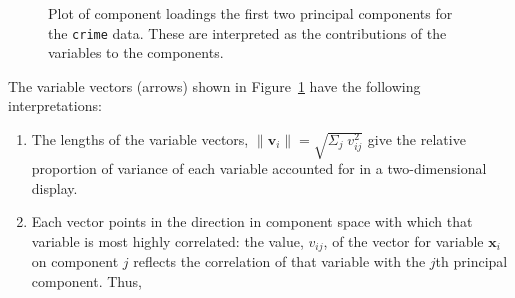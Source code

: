 \documentclass[
  letterpaper,
  10pt,
  krantz2]{krantz}
\begin{document}
\begin{figure}[H]


\caption{\label{fig-crime-vectors}Plot of component loadings the first
two principal components for the \texttt{crime} data. These are
interpreted as the contributions of the variables to the components.}

\end{figure}%

The variable vectors (arrows) shown in Figure~\ref{fig-crime-vectors}
have the following interpretations:

\begin{enumerate}
\def\labelenumi{(\arabic{enumi})}
\item
  The lengths of the variable vectors,
  \(\lVert\mathbf{v}_i\rVert = \sqrt{\Sigma_{j} \; v_{ij}^2}\) give the
  relative proportion of variance of each variable accounted for in a
  two-dimensional display.
\item
  Each vector points in the direction in component space with which that
  variable is most highly correlated: the value, \(v_{ij}\), of the
  vector for variable \(\mathbf{x}_i\) on component \(j\) reflects the
  correlation of that variable with the \(j\)th principal component.
  Thus,
\end{enumerate}
\end{document}

